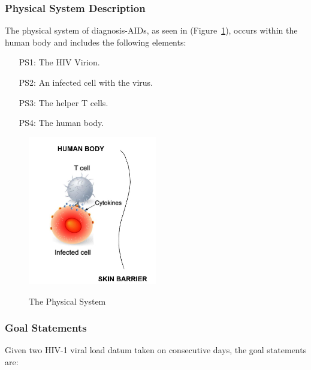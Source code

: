 \documentclass[12pt]{article}
\begin{document}
\subsubsection{Physical System Description} \label{sec_phySystDescrip}

The physical system of diagnosis-AIDs, as seen in 
(Figure~\ref{Fig_PhysicalSystem}), occurs within the human body and includes the 
following elements:

\begin{itemize}

\item[PS1:] The HIV Virion.

\item[PS2:] An infected cell with the virus.

\item[PS3:] The helper T cells.

\item[PS4:] The human body. 

\end{itemize}

 \begin{figure}[h!]
 \begin{center}
 {
  \includegraphics[width=0.5\textwidth]{physicalsys.jpg}
 }
 \caption{ The Physical System}\citep{wikifig}

 \label{Fig_PhysicalSystem}
 \end{center}
 \end{figure}

\subsubsection{Goal Statements}

\noindent Given two HIV-1 viral load datum taken on consecutive days, the goal 
statements are:
\end{document}
